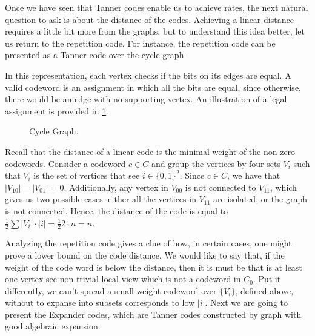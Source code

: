   Once we have seen that Tanner codes enable us to achieve rates, the next natural question to ask is about the distance of the codes. Achieving a linear distance requires a little bit more from the graphs, but to understand this idea better, let us return to the repetition code. For instance, the repetition code can be presented as a Tanner code over the cycle graph.  

  \begin{example}
    In this representation, each vertex checks if the bits on its edges are equal. A valid codeword is an assignment in which all the bits are equal, since otherwise, there would be an edge with no supporting vertex. An illustration of a legal assignment is provided in \cref{fig:cyc}.
  \end{example} 
 
 \begin{center}
  \begin{figure}[H]
  \caption{Cycle Graph.} 
  \label{fig:cyc}
\end{figure}
\end{center}
%
Recall that the distance of a linear code is the minimal weight of the non-zero codewords. Consider a codeword $c \in C$ and group the vertices by four sets $V_i$ such that $V_i$ is the set of vertices that see $i \in \{0,1\}^{2}$. Since $c \in C$, we have that $|V_{10}|=|V_{01}| = 0$. Additionally, any vertex in $V_{00}$ is not connected to $V_{11}$, which gives us two possible cases: either all the vertices in $V_{11}$ are isolated, or the graph is not connected. Hence, the distance of the code is equal to $\frac{1}{2}\sum{|V_{i}|\cdot |i|} = \frac{1}{2}2 \cdot n = n$.

Analyzing the repetition code gives a clue of how, in certain cases, one might prove a lower bound on the code distance. We would like to say that, if the weight of the code word is below the distance, then it is must be that is at least one vertex see non trivial local view which is not a codeword in $C_{0}$. Put it differently, we can't spread a small weight codeword over $\{V_{i}\}$, defined above, without to expanse into subsets corresponds to low $|i|$. Next we are going to present the Expander codes, which are Tanner codes constructed by graph with good algebraic expansion.   



